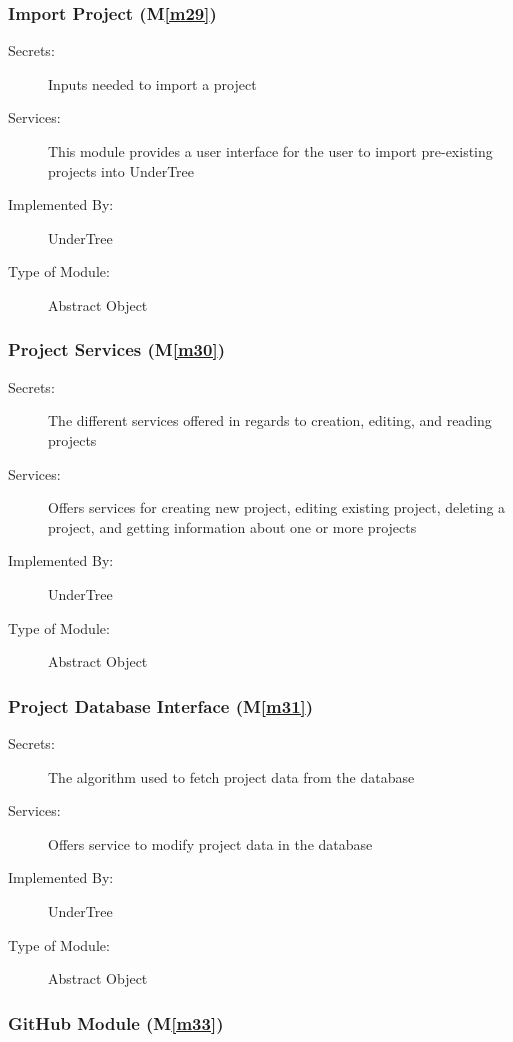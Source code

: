 \documentclass[12pt, titlepage]{article}
\newcommand{\mref}[1]{M\ref{#1}}
\begin{document}
	\subsubsection{Import Project (\mref{m29})}
	
	\begin{description}
		\item[Secrets:] Inputs needed to import a project
		\item[Services:] This module provides a user interface for the user to import pre-existing projects into UnderTree
		\item[Implemented By:] UnderTree
		\item[Type of Module:] Abstract Object
	\end{description}
	
	\subsubsection{Project Services (\mref{m30})}
	
	\begin{description}
		\item[Secrets:] The different services offered in regards to creation, editing, and reading projects
		\item[Services:] Offers services for creating new project, editing existing project, deleting a project, and getting information about one or more projects
		\item[Implemented By:] UnderTree
		\item[Type of Module:] Abstract Object
	\end{description}
	
	\subsubsection{Project Database Interface (\mref{m31})}
	
	\begin{description}
		\item[Secrets:] The algorithm used to fetch project data from the database
		\item[Services:] Offers service to modify project data in the database
		\item[Implemented By:] UnderTree
		\item[Type of Module:] Abstract Object
	\end{description}
	
	\subsubsection{GitHub Module (\mref{m33})}
	
\end{document}
